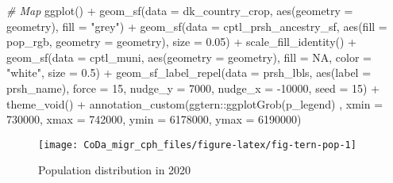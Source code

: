 \documentclass[
  12pt,
]{article}
\newenvironment{Shaded}{\begin{snugshade}}{\end{snugshade}}
\newcommand{\AttributeTok}[1]{\textcolor[rgb]{0.77,0.63,0.00}{#1}}
\newcommand{\CommentTok}[1]{\textcolor[rgb]{0.56,0.35,0.01}{\textit{#1}}}
\newcommand{\ConstantTok}[1]{\textcolor[rgb]{0.00,0.00,0.00}{#1}}
\newcommand{\DecValTok}[1]{\textcolor[rgb]{0.00,0.00,0.81}{#1}}
\newcommand{\FloatTok}[1]{\textcolor[rgb]{0.00,0.00,0.81}{#1}}
\newcommand{\FunctionTok}[1]{\textcolor[rgb]{0.00,0.00,0.00}{#1}}
\newcommand{\NormalTok}[1]{#1}
\newcommand{\SpecialCharTok}[1]{\textcolor[rgb]{0.00,0.00,0.00}{#1}}
\newcommand{\StringTok}[1]{\textcolor[rgb]{0.31,0.60,0.02}{#1}}
\begin{document}
\begin{Shaded}
\begin{Highlighting}[]
\CommentTok{\# Map}
\FunctionTok{ggplot}\NormalTok{() }\SpecialCharTok{+}
  \FunctionTok{geom\_sf}\NormalTok{(}\AttributeTok{data =}\NormalTok{ dk\_country\_crop,}
          \FunctionTok{aes}\NormalTok{(}\AttributeTok{geometry =}\NormalTok{ geometry),}
          \AttributeTok{fill =} \StringTok{"grey"}\NormalTok{) }\SpecialCharTok{+}
  \FunctionTok{geom\_sf}\NormalTok{(}\AttributeTok{data =}\NormalTok{ cptl\_prsh\_ancestry\_sf,}
          \FunctionTok{aes}\NormalTok{(}\AttributeTok{fill =}\NormalTok{ pop\_rgb, }\AttributeTok{geometry =}\NormalTok{ geometry),}
          \AttributeTok{size =} \FloatTok{0.05}\NormalTok{) }\SpecialCharTok{+}
  \FunctionTok{scale\_fill\_identity}\NormalTok{() }\SpecialCharTok{+}
  \FunctionTok{geom\_sf}\NormalTok{(}\AttributeTok{data =}\NormalTok{ cptl\_muni,}
          \FunctionTok{aes}\NormalTok{(}\AttributeTok{geometry =}\NormalTok{ geometry),}
          \AttributeTok{fill =} \ConstantTok{NA}\NormalTok{,}
          \AttributeTok{color =} \StringTok{"white"}\NormalTok{,}
          \AttributeTok{size =} \FloatTok{0.5}\NormalTok{) }\SpecialCharTok{+}
  \FunctionTok{geom\_sf\_label\_repel}\NormalTok{(}\AttributeTok{data =}\NormalTok{ prsh\_lbls,}
                      \FunctionTok{aes}\NormalTok{(}\AttributeTok{label =}\NormalTok{ prsh\_name),}
                      \AttributeTok{force =} \DecValTok{15}\NormalTok{,}
                      \AttributeTok{nudge\_y =}   \DecValTok{7000}\NormalTok{,}
                      \AttributeTok{nudge\_x =} \SpecialCharTok{{-}}\DecValTok{10000}\NormalTok{,}
                      \AttributeTok{seed =} \DecValTok{15}\NormalTok{) }\SpecialCharTok{+}
  \FunctionTok{theme\_void}\NormalTok{() }\SpecialCharTok{+}
  \FunctionTok{annotation\_custom}\NormalTok{(ggtern}\SpecialCharTok{::}\FunctionTok{ggplotGrob}\NormalTok{(p\_legend) ,}
                    \AttributeTok{xmin =}  \DecValTok{730000}\NormalTok{,}
                    \AttributeTok{xmax =}  \DecValTok{742000}\NormalTok{,}
                    \AttributeTok{ymin =} \DecValTok{6178000}\NormalTok{,}
                    \AttributeTok{ymax =} \DecValTok{6190000}\NormalTok{)}
\end{Highlighting}
\end{Shaded}

\begin{figure}[H]

{\centering \texttt{[image: CoDa\_migr\_cph\_files/figure-latex/fig-tern-pop-1]} 

}

\caption{Population distribution in 2020}\label{fig:fig-tern-pop}
\end{figure}
\end{document}

